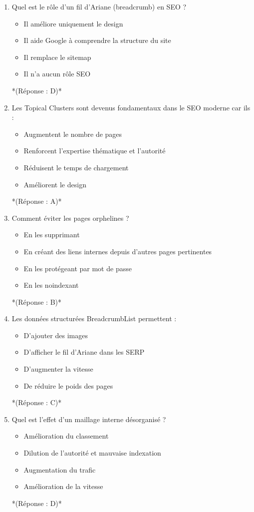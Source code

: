 \documentclass[12pt,a4paper,twoside]{report}
\begin{document}
\begin{enumerate}
\item Quel est le rôle d'un fil d'Ariane (breadcrumb) en SEO ?
\begin{itemize}
\item[A)] Il améliore uniquement le design
\item[B)] Il aide Google à comprendre la structure du site
\item[C)] Il remplace le sitemap
\item[D)] Il n'a aucun rôle SEO
\end{itemize}
*(Réponse : D)*

\item Les Topical Clusters sont devenus fondamentaux dans le SEO moderne car ils :
\begin{itemize}
\item[A)] Augmentent le nombre de pages
\item[B)] Renforcent l'expertise thématique et l'autorité
\item[C)] Réduisent le temps de chargement
\item[D)] Améliorent le design
\end{itemize}
*(Réponse : A)*

\item Comment éviter les pages orphelines ?
\begin{itemize}
\item[A)] En les supprimant
\item[B)] En créant des liens internes depuis d'autres pages pertinentes
\item[C)] En les protégeant par mot de passe
\item[D)] En les noindexant
\end{itemize}
*(Réponse : B)*

\item Les données structurées BreadcrumbList permettent :
\begin{itemize}
\item[A)] D'ajouter des images
\item[B)] D'afficher le fil d'Ariane dans les SERP
\item[C)] D'augmenter la vitesse
\item[D)] De réduire le poids des pages
\end{itemize}
*(Réponse : C)*

\item Quel est l'effet d'un maillage interne désorganisé ?
\begin{itemize}
\item[A)] Amélioration du classement
\item[B)] Dilution de l'autorité et mauvaise indexation
\item[C)] Augmentation du trafic
\item[D)] Amélioration de la vitesse
\end{itemize}
*(Réponse : D)*


\end{enumerate}
\end{document}
